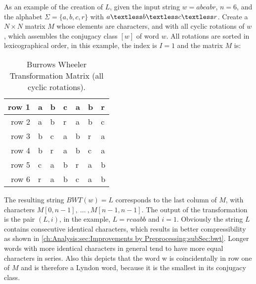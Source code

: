 \par {
As an example of the creation of $L$, given the input string $w = abcabr$, $n = 6$, and the alphabet $\Sigma = \{a,b,c,r\}$ with $a \textless b \textless c \textless r $. Create a $N \times N$ matrix $M$ whose elements are characters, and with all cyclic rotations of $w$, which assembles the conjugacy class $[w]$ of word $w$. All rotations are sorted in lexicographical order, in this example, the index is $I = 1$ and the matrix $M$ is:

\begin{table}[h]
	\centering
	\begin{tabular}{r|l|l|l|l|l|l}
		row 1 & a & b & c & a & b & r\\
		\hline
		row 2 & a & b & r & a & b & c\\
		\hline
		row 3 & b & c & a & b & r & a\\
		\hline
		row 4 & b & r & a & b & c & a\\
		\hline
		row 5 & c & a & b & r & a & b\\
		\hline
		row 6 & r & a & b & c & a & b		\label{tab:t10 bwt-example}
	\end{tabular}
	\caption{Burrows Wheeler Transformation Matrix (all cyclic rotations).}
\end{table}
The resulting string $BWT(w)=L$ corresponds to the last column of $M$, with characters $M[0,n -1],\: \dots \: ,M[n - 1, n - 1]$. The output of the transformation is the pair $(L, i)$, in the example, $L = rcaabb$ and $i = 1$. Obviously the string $L$ contains consecutive identical characters, which results in better compressibility as shown in \ref{ch:Analysis:sec:Improvements by Preprocessing:subSec:bwt}. Longer words with more identical characters in general tend to have more equal characters in series. Also this depicts that the word w is coincidentally in row one of $M$ and is therefore a Lyndon word, because it is the smallest in its conjugacy class.
}

